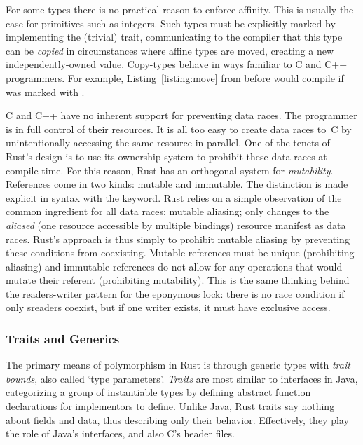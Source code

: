 For some types there is no practical reason to enforce affinity. This is usually the case for primitives such as integers. 
Such types must be explicitly marked by implementing the (trivial)  trait, communicating to the compiler that this type can be \textit{copied} in circumstances where affine types are moved, creating a new independently-owned value. Copy-types behave in ways familiar to C and C++ programmers. For example, Listing~\ref{listing:move} from before would compile if  was marked with .

C and C++ have no inherent support for preventing data races. The programmer is in full control of their resources. It is all too easy to create data races to~C by unintentionally accessing the same resource in parallel. One of the tenets of Rust's design is to use its ownership system to prohibit these data races at compile time. For this reason, Rust has an orthogonal system for \textit{mutability}. References come in two kinds: mutable and immutable. The distinction is made explicit in syntax with the  keyword. Rust relies on a simple observation of the common ingredient for all data races: mutable aliasing; only changes to the \textit{aliased} (one resource accessible by multiple bindings) resource manifest as data races. Rust's approach is thus simply to prohibit mutable aliasing by preventing these conditions from coexisting. Mutable references must be unique (prohibiting aliasing) and immutable references do not allow for any operations that would mutate their referent (prohibiting mutability). This is the same thinking behind the readers-writer pattern for the eponymous lock: there is no race condition if only sreaders coexist, but if one writer exists, it must have exclusive access. 





\subsubsection{Traits and Generics}
The primary means of polymorphism in Rust is through generic types with \textit{trait bounds}, also called `type parameters'. \textit{Traits} are most similar to interfaces in Java, categorizing a group of instantiable types by defining abstract function declarations for implementors to define. Unlike Java, Rust traits say nothing about fields and data, thus describing only their behavior. Effectively, they play the role of Java's interfaces, and also C's header files.


